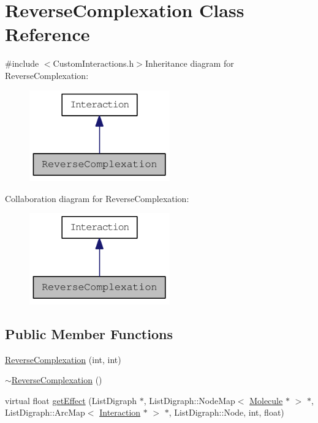 \hypertarget{classReverseComplexation}{
\section{ReverseComplexation Class Reference}
\label{classReverseComplexation}
}


{\ttfamily \#include $<$CustomInteractions.h$>$}Inheritance diagram for ReverseComplexation:\nopagebreak
\begin{figure}[H]
\begin{center}
\leavevmode
\includegraphics[width=172pt]{classReverseComplexation__inherit__graph}
\end{center}
\end{figure}
Collaboration diagram for ReverseComplexation:\nopagebreak
\begin{figure}[H]
\begin{center}
\leavevmode
\includegraphics[width=172pt]{classReverseComplexation__coll__graph}
\end{center}
\end{figure}
\subsection*{Public Member Functions}
\begin{DoxyCompactItemize}
\item 
\hyperlink{classReverseComplexation_a12c42d3947dcd67f5cff0e9dd218a4c6}{ReverseComplexation} (int, int)
\item 
\hyperlink{classReverseComplexation_a8f2824bf550b11d11dd51db704534473}{$\sim$ReverseComplexation} ()
\item 
virtual float \hyperlink{classReverseComplexation_a9dceec2b67efbe7c14a7e53c959263f5}{getEffect} (ListDigraph $\ast$, ListDigraph::NodeMap$<$ \hyperlink{classMolecule}{Molecule} $\ast$ $>$ $\ast$, ListDigraph::ArcMap$<$ \hyperlink{classInteraction}{Interaction} $\ast$ $>$ $\ast$, ListDigraph::Node, int, float)
\end{DoxyCompactItemize}
